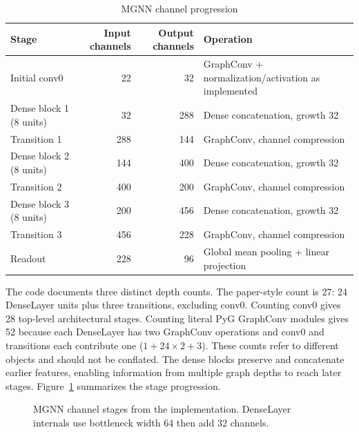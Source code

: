 \begin{table}[H]\centering\small\caption{MGNN channel progression}\label{tab:mgnn}\begin{tabular}{lrrl}\toprule Stage & Input channels & Output channels & Operation\\\midrule Initial conv0 & 22 & 32 & GraphConv + normalization/activation as implemented\\Dense block 1 (8 units) & 32 & 288 & Dense concatenation, growth 32\\Transition 1 & 288 & 144 & GraphConv, channel compression\\Dense block 2 (8 units) & 144 & 400 & Dense concatenation, growth 32\\Transition 2 & 400 & 200 & GraphConv, channel compression\\Dense block 3 (8 units) & 200 & 456 & Dense concatenation, growth 32\\Transition 3 & 456 & 228 & GraphConv, channel compression\\Readout & 228 & 96 & Global mean pooling + linear projection\\\bottomrule\end{tabular}\end{table}

The code documents three distinct depth counts. The paper-style count is 27: 24 DenseLayer units plus three transitions, excluding conv0. Counting conv0 gives 28 top-level architectural stages. Counting literal PyG GraphConv modules gives 52 because each DenseLayer has two GraphConv operations and conv0 and transitions each contribute one ($1+24\times2+3$). These counts refer to different objects and should not be conflated. The dense blocks preserve and concatenate earlier features, enabling information from multiple graph depths to reach later stages. Figure~\ref{fig:mgnn} summarizes the stage progression.
\begin{figure}[H]\centering{}\caption{MGNN channel stages from the implementation. DenseLayer internals use bottleneck width 64 then add 32 channels.}\label{fig:mgnn}\end{figure}

